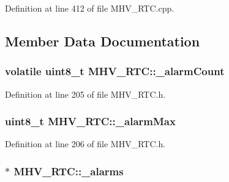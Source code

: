 \-Definition at line 412 of file \-M\-H\-V\-\_\-\-R\-T\-C.\-cpp.



\subsection{\-Member \-Data \-Documentation}
\hypertarget{class_m_h_v___r_t_c_a953a79952c9fa5fde5d1dacbc03d3b46}{
\subsubsection[{\-\_\-alarm\-Count}]{\setlength{\rightskip}{0pt plus 5cm}volatile uint8\-\_\-t {\bf \-M\-H\-V\-\_\-\-R\-T\-C\-::\-\_\-alarm\-Count}}}
\label{class_m_h_v___r_t_c_a953a79952c9fa5fde5d1dacbc03d3b46}


\-Definition at line 205 of file \-M\-H\-V\-\_\-\-R\-T\-C.\-h.

\hypertarget{class_m_h_v___r_t_c_aed7d37466a99362b78dd9ccf1390d35c}{
\subsubsection[{\-\_\-alarm\-Max}]{\setlength{\rightskip}{0pt plus 5cm}uint8\-\_\-t {\bf \-M\-H\-V\-\_\-\-R\-T\-C\-::\-\_\-alarm\-Max}}}
\label{class_m_h_v___r_t_c_aed7d37466a99362b78dd9ccf1390d35c}


\-Definition at line 206 of file \-M\-H\-V\-\_\-\-R\-T\-C.\-h.

\hypertarget{class_m_h_v___r_t_c_afaaed6deea21b52f8bde5f8ebc0abf70}{
\subsubsection[{\-\_\-alarms}]{$\ast$ {\bf \-M\-H\-V\-\_\-\-R\-T\-C\-::\-\_\-alarms}}}
\label{class_m_h_v___r_t_c_afaaed6deea21b52f8bde5f8ebc0abf70}


